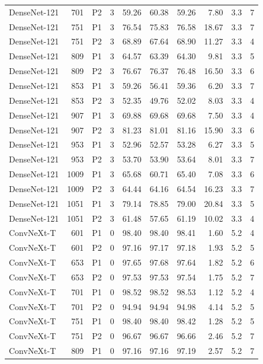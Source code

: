{\begin{longtable}{lrllrrrrrr}
DenseNet-121 & 701 & P2 & 3 & 59.26 & 60.38 & 59.26 & 7.80 & 3.3 & 7 \\
DenseNet-121 & 751 & P1 & 3 & 76.54 & 75.83 & 76.58 & 18.67 & 3.3 & 7 \\
DenseNet-121 & 751 & P2 & 3 & 68.89 & 67.64 & 68.90 & 11.27 & 3.3 & 4 \\
DenseNet-121 & 809 & P1 & 3 & 64.57 & 63.39 & 64.30 & 9.81 & 3.3 & 5 \\
DenseNet-121 & 809 & P2 & 3 & 76.67 & 76.37 & 76.48 & 16.50 & 3.3 & 6 \\
DenseNet-121 & 853 & P1 & 3 & 59.26 & 56.41 & 59.36 & 6.20 & 3.3 & 7 \\
DenseNet-121 & 853 & P2 & 3 & 52.35 & 49.76 & 52.02 & 8.03 & 3.3 & 4 \\
DenseNet-121 & 907 & P1 & 3 & 69.88 & 69.68 & 69.68 & 7.50 & 3.3 & 4 \\
DenseNet-121 & 907 & P2 & 3 & 81.23 & 81.01 & 81.16 & 15.90 & 3.3 & 6 \\
DenseNet-121 & 953 & P1 & 3 & 52.96 & 52.57 & 53.28 & 6.27 & 3.3 & 5 \\
DenseNet-121 & 953 & P2 & 3 & 53.70 & 53.90 & 53.64 & 8.01 & 3.3 & 7 \\
DenseNet-121 & 1009 & P1 & 3 & 65.68 & 60.71 & 65.40 & 7.08 & 3.3 & 6 \\
DenseNet-121 & 1009 & P2 & 3 & 64.44 & 64.16 & 64.54 & 16.23 & 3.3 & 7 \\
DenseNet-121 & 1051 & P1 & 3 & 79.14 & 78.85 & 79.00 & 20.84 & 3.3 & 5 \\
DenseNet-121 & 1051 & P2 & 3 & 61.48 & 57.65 & 61.19 & 10.02 & 3.3 & 4 \\
ConvNeXt-T & 601 & P1 & 0 & 98.40 & 98.40 & 98.41 & 1.60 & 5.2 & 4 \\
ConvNeXt-T & 601 & P2 & 0 & 97.16 & 97.17 & 97.18 & 1.93 & 5.2 & 5 \\
ConvNeXt-T & 653 & P1 & 0 & 97.65 & 97.68 & 97.64 & 1.82 & 5.2 & 6 \\
ConvNeXt-T & 653 & P2 & 0 & 97.53 & 97.53 & 97.54 & 1.75 & 5.2 & 7 \\
ConvNeXt-T & 701 & P1 & 0 & 98.52 & 98.52 & 98.53 & 1.12 & 5.2 & 4 \\
ConvNeXt-T & 701 & P2 & 0 & 94.94 & 94.94 & 94.98 & 4.14 & 5.2 & 5 \\
ConvNeXt-T & 751 & P1 & 0 & 98.40 & 98.40 & 98.42 & 1.28 & 5.2 & 5 \\
ConvNeXt-T & 751 & P2 & 0 & 96.67 & 96.67 & 96.66 & 2.46 & 5.2 & 7 \\
ConvNeXt-T & 809 & P1 & 0 & 97.16 & 97.16 & 97.19 & 2.57 & 5.2 & 7 \\

\end{longtable}}
